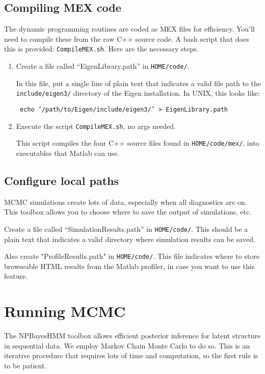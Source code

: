 \documentclass[fontsize=12]{article}
\begin{document}
\subsection{ Compiling MEX code }
The dynamic programming routines are coded as MEX files for efficiency.  You'll need to compile these from the raw C++ source code.  A bash script that does this is provided: \texttt{CompileMEX.sh}. Here are the necessary steps.

\begin{enumerate}
\item Create a file called ``EigenLibrary.path'' in \texttt{HOME/code/}.  

In this file, put a single line of plain text that indicates a valid file path to the \texttt{include/eigen3/} directory of the Eigen installation. In UNIX, this looks like:

\texttt{ echo '/path/to/Eigen/include/eigen3/' > EigenLibrary.path}

\item Execute the script \texttt{CompileMEX.sh}, no args needed.

This script compiles the four C++ source files found in \texttt{HOME/code/mex/}, into executables that Matlab can use.

\end{enumerate}

\subsection{ Configure local paths }

MCMC simulations create lots of data, especially when all diagnostics are on.  This toolbox allows you to choose where to save the output of simulations, etc.

Create a file called ``SimulationResults.path'' in \texttt{HOME/code/}.  This should be a plain text that indicates a valid directory where simulation results can be saved. 

Also create "ProfileResults.path" in \texttt{HOME/code/}. This file indicates where to store browseable HTML results from the Matlab profiler, in case you want to use this feature.

\section{ Running MCMC }

The NPBayesHMM toolbox allows efficient posterior inference for latent structure in sequential data.  We employ Markov Chain Monte Carlo to do so.   This is an iterative procedure that requires lots of time and computation, so the first rule is to be patient.  
\end{document}
